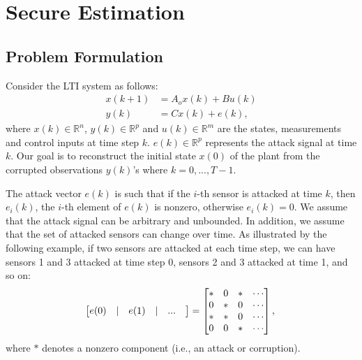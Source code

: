 \documentclass[../../thesis.tex]{subfiles}
\begin{document}



\section{Secure Estimation}\label{sec:SE}

\subsection{Problem Formulation}
Consider the LTI system as follows:
\begin{equation}
\begin{aligned}
x(k+1) &= A_o x(k) + B u(k) \\
y(k) &= C x(k) + e(k),
\end{aligned} 
\label{eq:system_model_se}
\end{equation} 
where $x(k) \in \mathbb{R}^n$, $y(k) \in \mathbb{R}^p$ and $u(k) \in \mathbb{R}^m$ are the states, measurements and control inputs at time step $k$. $e(k) \in \mathbb{R}^p$ represents the attack signal at time $k$. Our goal is to reconstruct the initial state $x(0)$ of the plant from the corrupted observations $y(k)$'s where $k=0,...,T-1$.

The attack vector $e(k)$ is such that if the $i$-th sensor is attacked at time $k$, then $e_i(k)$, the $i$-th element of $e(k)$ is nonzero, otherwise $e_i(k) = 0$. We assume that the attack signal can be arbitrary and unbounded. In addition, we assume that the set of attacked sensors can change over time. As illustrated by the following example, if two sensors are attacked at each time step, we can have sensors 1 and 3 attacked at time step 0, sensors 2 and 3 attacked at time 1, and so on:
\begin{equation}
	\begin{bmatrix} e(0)  & \lvert & e(1) & \lvert &  ...  & \end{bmatrix} 
	= \begin{bmatrix} * & 0 & * & \cdots \\
					       0 & * & 0 & \cdots \\
					       * & * & 0 & \cdots \\
					       0 & 0 & * &\cdots 
			\end{bmatrix}, \nonumber \\
\end{equation}
where $*$ denotes a nonzero component (i.e., an attack or corruption). 
\end{document}
